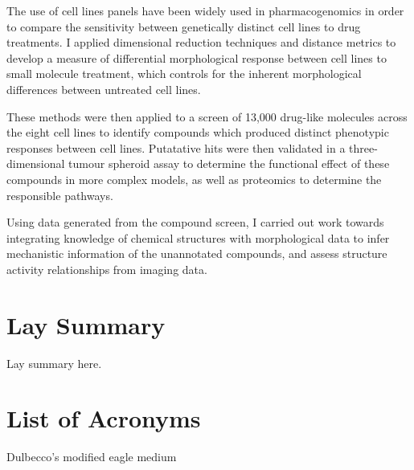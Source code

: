\documentclass[a4paper,11pt,twoside,openright]{scrbook}
\begin{document}
The use of cell lines panels have been widely used in pharmacogenomics in order to compare the sensitivity between genetically distinct cell lines to drug treatments.
I applied dimensional reduction techniques and distance metrics to develop a measure of differential morphological response between cell lines to small molecule treatment, which controls for the inherent morphological differences between untreated cell lines.

These methods were then applied to a screen of 13,000 drug-like molecules across the eight cell lines to identify compounds which produced distinct phenotypic responses between cell lines.
Putatative hits were then validated in a three-dimensional tumour spheroid assay to determine the functional effect of these compounds in more complex models, as well as proteomics to determine the responsible pathways.

Using data generated from the compound screen, I carried out work towards integrating knowledge of chemical structures with morphological data to infer mechanistic information of the unannotated compounds, and assess structure activity relationships from imaging data.


\chapter*{Lay Summary}
Lay summary here.

\clearpage
\tableofcontents
{}

\clearpage
\listoffigures
{}

\clearpage
\listoftables
{}
\clearpage

\chapter*{List of Acronyms}

\begin{acronym}
     Dulbecco's modified eagle medium
\end{acronym}
\end{document}
